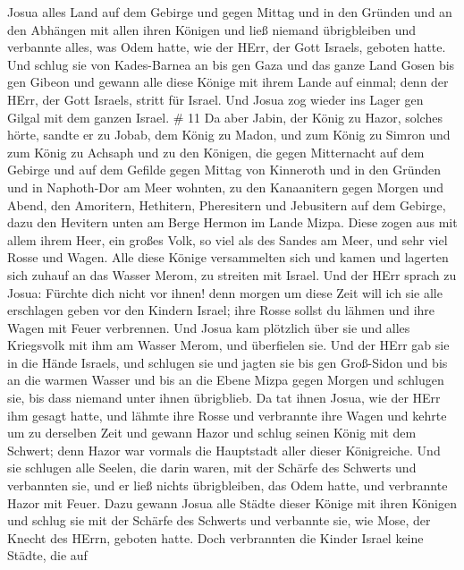 Josua alles Land auf dem Gebirge und gegen Mittag und in den Gründen und
an den Abhängen mit allen ihren Königen und ließ niemand übrigbleiben
und verbannte alles, was Odem hatte, wie der HErr, der Gott Israels,
geboten hatte.  Und schlug sie von Kades-Barnea an bis gen
Gaza und das ganze Land Gosen bis gen Gibeon  und gewann
alle diese Könige mit ihrem Lande auf einmal; denn der HErr, der Gott
Israels, stritt für Israel.  Und Josua zog wieder ins Lager
gen Gilgal mit dem ganzen Israel. \# 11  Da aber Jabin, der
König zu Hazor, solches hörte, sandte er zu Jobab, dem König zu Madon,
und zum König zu Simron und zum König zu Achsaph  und zu den
Königen, die gegen Mitternacht auf dem Gebirge und auf dem Gefilde gegen
Mittag von Kinneroth und in den Gründen und in Naphoth-Dor am Meer
wohnten,  zu den Kanaanitern gegen Morgen und Abend, den
Amoritern, Hethitern, Pheresitern und Jebusitern auf dem Gebirge, dazu
den Hevitern unten am Berge Hermon im Lande Mizpa.  Diese
zogen aus mit allem ihrem Heer, ein großes Volk, so viel als des Sandes
am Meer, und sehr viel Rosse und Wagen.  Alle diese Könige
versammelten sich und kamen und lagerten sich zuhauf an das Wasser
Merom, zu streiten mit Israel.  Und der HErr sprach zu
Josua: Fürchte dich nicht vor ihnen! denn morgen um diese Zeit will ich
sie alle erschlagen geben vor den Kindern Israel; ihre Rosse sollst du
lähmen und ihre Wagen mit Feuer verbrennen.  Und Josua kam
plötzlich über sie und alles Kriegsvolk mit ihm am Wasser Merom, und
überfielen sie.  Und der HErr gab sie in die Hände Israels,
und schlugen sie und jagten sie bis gen Groß-Sidon und bis an die warmen
Wasser und bis an die Ebene Mizpa gegen Morgen und schlugen sie, bis
dass niemand unter ihnen übrigblieb.  Da tat ihnen Josua,
wie der HErr ihm gesagt hatte, und lähmte ihre Rosse und verbrannte ihre
Wagen  und kehrte um zu derselben Zeit und gewann Hazor und
schlug seinen König mit dem Schwert; denn Hazor war vormals die
Hauptstadt aller dieser Königreiche.  Und sie schlugen alle
Seelen, die darin waren, mit der Schärfe des Schwerts und verbannten
sie, und er ließ nichts übrigbleiben, das Odem hatte, und verbrannte
Hazor mit Feuer.  Dazu gewann Josua alle Städte dieser
Könige mit ihren Königen und schlug sie mit der Schärfe des Schwerts und
verbannte sie, wie Mose, der Knecht des HErrn, geboten hatte.
 Doch verbrannten die Kinder Israel keine Städte, die auf
